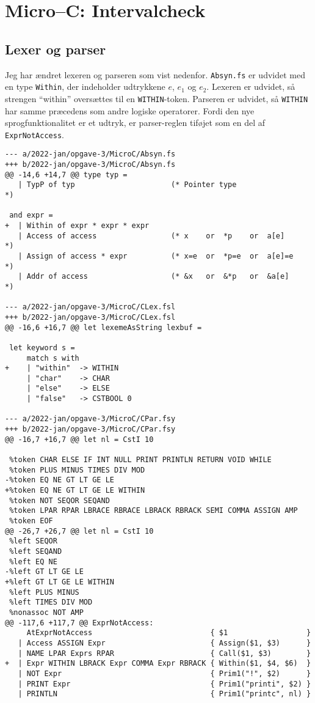 \section{Micro–C: Intervalcheck}

\subsection{Lexer og parser}

Jeg har ændret lexeren og parseren som vist nedenfor. \texttt{Absyn.fs} er udvidet med en type \texttt{Within}, der indeholder udtrykkene $e$, $e_1$ og $e_2$. Lexeren er udvidet, så strengen ``within'' oversættes til en \texttt{WITHIN}-token. Parseren er udvidet, så \texttt{WITHIN} har samme præcedens som andre logiske operatorer. Fordi den nye sprogfunktionalitet er et udtryk, er parser-reglen tiføjet som en del af \texttt{ExprNotAccess}.

\begin{verbatim}
--- a/2022-jan/opgave-3/MicroC/Absyn.fs
+++ b/2022-jan/opgave-3/MicroC/Absyn.fs
@@ -14,6 +14,7 @@ type typ =
   | TypP of typ                      (* Pointer type                *)
                                                                    
 and expr =                                                         
+  | Within of expr * expr * expr
   | Access of access                 (* x    or  *p    or  a[e]     *)
   | Assign of access * expr          (* x=e  or  *p=e  or  a[e]=e   *)
   | Addr of access                   (* &x   or  &*p   or  &a[e]    *)

--- a/2022-jan/opgave-3/MicroC/CLex.fsl
+++ b/2022-jan/opgave-3/MicroC/CLex.fsl
@@ -16,6 +16,7 @@ let lexemeAsString lexbuf =
 
 let keyword s =
     match s with
+    | "within"  -> WITHIN
     | "char"    -> CHAR 
     | "else"    -> ELSE
     | "false"   -> CSTBOOL 0

--- a/2022-jan/opgave-3/MicroC/CPar.fsy
+++ b/2022-jan/opgave-3/MicroC/CPar.fsy
@@ -16,7 +16,7 @@ let nl = CstI 10
 
 %token CHAR ELSE IF INT NULL PRINT PRINTLN RETURN VOID WHILE
 %token PLUS MINUS TIMES DIV MOD
-%token EQ NE GT LT GE LE
+%token EQ NE GT LT GE LE WITHIN
 %token NOT SEQOR SEQAND
 %token LPAR RPAR LBRACE RBRACE LBRACK RBRACK SEMI COMMA ASSIGN AMP
 %token EOF
@@ -26,7 +26,7 @@ let nl = CstI 10
 %left SEQOR
 %left SEQAND
 %left EQ NE 
-%left GT LT GE LE
+%left GT LT GE LE WITHIN
 %left PLUS MINUS
 %left TIMES DIV MOD 
 %nonassoc NOT AMP 
@@ -117,6 +117,7 @@ ExprNotAccess:
     AtExprNotAccess                           { $1                  }
   | Access ASSIGN Expr                        { Assign($1, $3)      }
   | NAME LPAR Exprs RPAR                      { Call($1, $3)        }  
+  | Expr WITHIN LBRACK Expr COMMA Expr RBRACK { Within($1, $4, $6)  }
   | NOT Expr                                  { Prim1("!", $2)      }
   | PRINT Expr                                { Prim1("printi", $2) }
   | PRINTLN                                   { Prim1("printc", nl) }
\end{verbatim}

